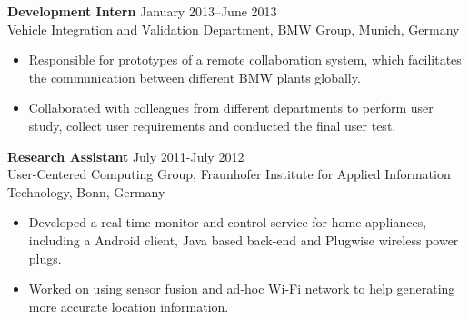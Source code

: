 \documentclass[margin, 10pt]{res} %
\begin{document}
\begin{resume}
\begin{CJK}{UTF8}{gbsn}
\textbf{Development Intern} \hfill January 2013–June 2013 \\
Vehicle Integration and Validation Department, BMW Group, Munich, Germany 

\begin{itemize} \itemsep -2pt %
\item Responsible for prototypes of a remote collaboration system, which facilitates the communication between different BMW plants globally.
\item Collaborated with colleagues from different departments to perform user study, collect user requirements and conducted the final user test.
\end{itemize}
 
\textbf{Research Assistant} \hfill July 2011-July 2012 \\
User-Centered Computing Group, Fraunhofer Institute for Applied Information Technology, Bonn, Germany
\begin{itemize}  \itemsep -2pt %
\item Developed a real-time monitor and control service for home appliances, including a Android client, Java based back-end and Plugwise wireless power plugs.
\item Worked on using sensor fusion and ad-hoc Wi-Fi network to help generating more accurate location information.
\end{itemize} 



\end{CJK}
\end{resume}
\end{document}
